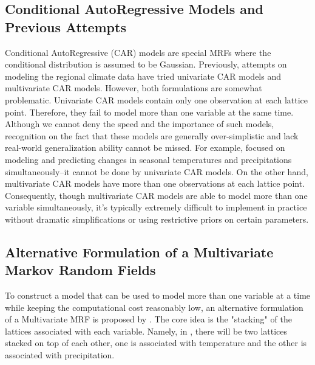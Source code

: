 \documentclass{article}
\begin{document}
\subsection{Conditional AutoRegressive Models and Previous Attempts}
Conditional AutoRegressive (CAR) models are special MRFs where the conditional distribution is assumed to be Gaussian. Previously, attempts on modeling the regional climate data have tried univariate CAR models and multivariate CAR models. However, both formulations are somewhat problematic. Univariate CAR models contain only one observation at each lattice point. Therefore, they fail to model more than one variable at the same time. Although we cannot deny the speed and the importance of such models, recognition on the fact that these models are generally over-simplistic and lack real-world generalization ability cannot be missed. For example, \cite{paper} focused on modeling and predicting changes in seasonal temperatures and precipitations simultaneously--it cannot be done by univariate CAR models. On the other hand, multivariate CAR models have more than one observations at each lattice point. Consequently, though multivariate CAR models are able to model more than one variable simultaneously, it's typically extremely difficult to implement in practice without dramatic simplifications or using restrictive priors on certain parameters. 

\subsection{Alternative Formulation of a Multivariate Markov Random Fields}
To construct a model that can be used to model more than one variable at a time while keeping the computational cost reasonably low, an alternative formulation of a Multivariate MRF is proposed by \cite{paper}. The core idea is the "stacking" of the lattices associated with each variable. Namely, in \cite{paper}, there will be two lattices stacked on top of each other, one is associated with temperature and the other is associated with precipitation.
\end{document}
